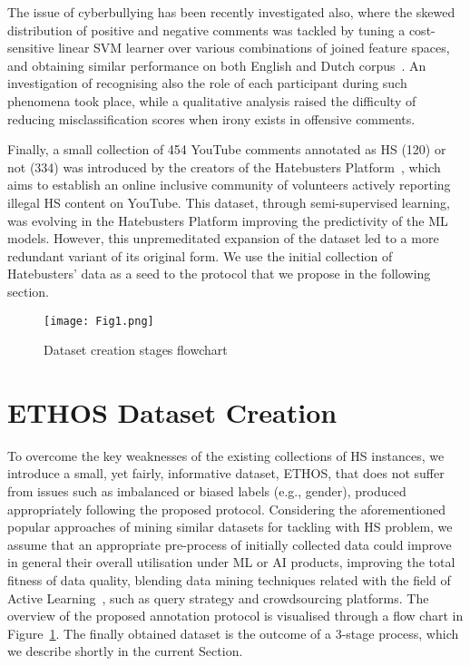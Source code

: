 \documentclass{article}
\begin{document}
The issue of cyberbullying has been recently investigated also, where the skewed distribution of positive and negative comments was tackled by tuning a cost-sensitive linear SVM learner over various combinations of joined feature spaces, and obtaining similar performance on both English and Dutch corpus~\cite{VanHee2018}. An investigation of recognising also the role of each participant during such phenomena took place, while a qualitative analysis raised the difficulty of reducing misclassification scores when irony exists in offensive comments.

Finally, a small collection of 454 YouTube comments annotated as HS (120) or not (334) was introduced by the creators of the Hatebusters Platform~\cite{hatebusters}, which aims to establish an online inclusive community of volunteers actively reporting illegal HS content on YouTube. This dataset, through semi-supervised learning, was evolving in the Hatebusters Platform improving the predictivity of the ML models. However, this unpremeditated expansion of the dataset led to a more redundant variant of its original form. We use the initial collection of Hatebusters' data as a seed to the protocol that we propose in the following section.



\begin{figure}[!ht]
    \centering
    \texttt{[image: Fig1.png]}
    \caption{Dataset creation stages flowchart}
    \label{fig:dcreation}
\end{figure}


\section{ETHOS Dataset Creation}
To overcome the key weaknesses of the existing collections of HS instances, we introduce a small, yet fairly, informative dataset, ETHOS, that does not suffer from issues such as imbalanced or biased labels (e.g., gender), produced appropriately following the proposed protocol. Considering the aforementioned popular approaches of mining similar datasets for tackling with HS problem, we assume that an appropriate pre-process of initially collected data could improve in general their overall utilisation under ML or AI products, improving the total fitness of data quality, blending data mining techniques related with the field of Active Learning~\cite{DBLP:conf/naacl/SharmaZB15}, such as query strategy and crowdsourcing platforms. The overview of the proposed annotation protocol is visualised through a flow chart in Figure~\ref{fig:dcreation}. The finally obtained dataset is the outcome of a 3-stage process, which we describe shortly in the current Section.
\end{document}
